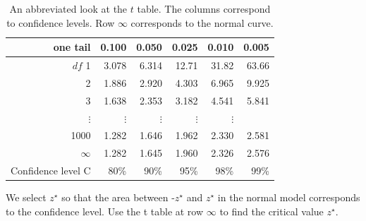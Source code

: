 \begin{table}[hht]
\centering
\begin{tabular}{r | rrr rr}
one tail & \hspace{1.5mm}  0.100 & \hspace{1.5mm} 0.050 & \hspace{1.5mm} 0.025 & \hspace{1.5mm} 0.010 & \hspace{1.5mm} 0.005  \\
\hline
{$df$} \hfill 1  &  {\normalsize  3.078} & {\normalsize  6.314} & {\normalsize 12.71} & {\normalsize 31.82} & {\normalsize 63.66}  \\ 
2  &  {\normalsize  1.886} & {\normalsize  2.920} & {\normalsize  4.303} & {\normalsize  6.965} & {\normalsize  9.925}  \\ 
3  &  {\normalsize  1.638} & {\normalsize  2.353} & {\normalsize  3.182} & {\normalsize  4.541} & {\normalsize  5.841}  \\ 
$\vdots$ & $\vdots$ &$\vdots$ &$\vdots$ &$\vdots$ & \\
1000  &  {\normalsize  1.282} & {\normalsize  1.646} & {\normalsize  1.962} & {\normalsize  2.330} & {\normalsize  2.581}  \\ 
$\infty$   &  {\normalsize  1.282} & {\normalsize  1.645} & {\normalsize  1.960} & {\normalsize  2.326} & {\normalsize  2.576}   \\
\hline
Confidence level C  &  {\normalsize  80\%} & {\normalsize 90\%} & {\normalsize 95\%} & {\normalsize  98\%} & {\normalsize  99\%}  \\
\hline
\end{tabular}
\caption{An abbreviated look at the $t$ table. The columns correspond to confidence levels. Row $\infty$ corresponds to the normal curve.}
\label{tTableSample}
\end{table}


\begin{tipBox}{We select $z^{\star}$ so that the area between -$z^{\star}$ and $z^{\star}$ in the normal model corresponds to the confidence level. Use the t table at row $\infty$ to find the critical value $z^{\star}$.}
\end{tipBox}

